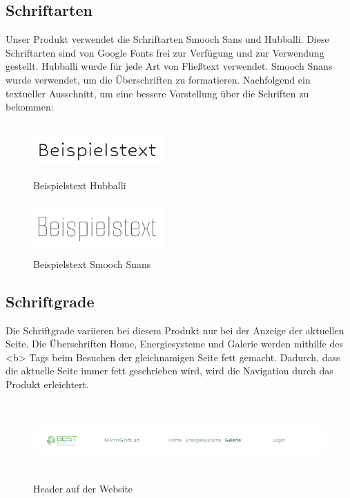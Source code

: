 \subsection{Schriftarten}
Unser Produkt verwendet die Schriftarten Smooch Sans und Hubballi. Diese Schriftarten sind von Google Fonts frei zur Verfügung und zur Verwendung gestellt. Hubballi wurde für jede Art von Fließtext verwendet. Smooch Snans wurde verwendet, um die Überschriften zu formatieren. Nachfolgend ein textueller Ausschnitt, um eine bessere Vorstellung über die Schriften zu bekommen:
\begin{figure}[h]
	\centering
	\includegraphics[height=2cm,width=5cm]{images/HubaliBeispielstext}
	\caption{Beispielstext Hubballi}
	\label{fig: Beispielstext Hubballi}
\end{figure}
\begin{figure}[h]
	\centering
	\includegraphics[height=2cm,width=5cm]{images/BeispielstextSmothSans}
	\caption{Beispielstext Smooch Snans}
	\label{fig: BeispielstextSmothSans}
\end{figure}
\subsection{Schriftgrade}
Die Schriftgrade variieren bei diesem Produkt nur bei der Anzeige der aktuellen Seite.
Die Überschriften Home, Energiesysteme und Galerie werden mithilfe des <b> Tags beim Besuchen der gleichnamigen Seite fett gemacht. Dadurch, dass die aktuelle Seite immer fett geschrieben wird, wird die Navigation durch das Produkt erleichtert.
\begin{figure}[h]
	\centering
	\includegraphics[height=3cm,width=16cm]{images/Header}
	\caption{Header auf der Website}
	\label{fig: Header}
\end{figure}
\newpage
